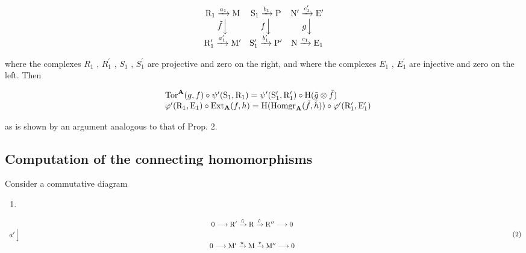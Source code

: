 \[
\begin{array}{c c c} \mathrm{R} _ {1} \xrightarrow {a _ {1}} \mathrm{M} & \mathrm{S} _ {1} \xrightarrow {b _ {1}} \mathrm{P} & \mathrm{N} ^ {\prime} \xrightarrow {c _ {1} ^ {\prime}} \mathrm{E} ^ {\prime} \\ \tilde {f} \Big \downarrow & f \Big \downarrow & g \Big \downarrow \\ \mathrm{R} _ {1} ^ {\prime} \xrightarrow {a _ {1} ^ {\prime}} \mathrm{M} ^ {\prime} & \mathrm{S} _ {1} ^ {\prime} \xrightarrow {b _ {1} ^ {\prime}} \mathrm{P} ^ {\prime} & \mathrm{N} \xrightarrow {c _ {1}} \mathrm{E} _ {1} \end{array}
\]

where the complexes \(R_{1}\) , \(R_{1}^{\prime}\) , \(S_{1}\) , \(S_{1}^{\prime}\) are projective and zero on the right, and where the complexes \(E_{1}\) , \(E_{1}^{\prime}\) are injective and zero on the left. Then

\[
\begin{array}{r l} & {\mathrm{Tor} ^ {\mathbf {A}} (g, f) \circ \psi^ {\prime} (\mathrm{S} _ {1}, \mathrm{R} _ {1}) = \psi^ {\prime} (\mathrm{S} _ {1} ^ {\prime}, \mathrm{R} _ {1} ^ {\prime}) \circ \mathrm{H} (\tilde {g} \otimes \tilde {f})} \\ & {\varphi^ {\prime} (\mathrm{R} _ {1}, \mathrm{E} _ {1}) \circ \mathrm{Ext} _ {\mathbf {A}} (f, h) = \mathrm{H} (\mathrm{Homgr} _ {\mathbf {A}} (\tilde {f}, \tilde {h})) \circ \varphi^ {\prime} (\mathrm{R} _ {1} ^ {\prime}, \mathrm{E} _ {1} ^ {\prime})} \end{array}
\]

as is shown by an argument analogous to that of Prop. 2.

\subsection{Computation of the connecting homomorphisms}

Consider a commutative diagram

\begin{enumerate}
\def\labelenumi{(\arabic{enumi})}
\tightlist
\item
\end{enumerate}

\[
\begin{array}{c} 0 \longrightarrow \mathrm{R} ^ {\prime} \xrightarrow {\tilde {u}} \mathrm{R} \xrightarrow {\tilde {v}} \mathrm{R} ^ {\prime \prime} \longrightarrow 0 \\ a ^ {\prime} \Big \downarrow \qquad \qquad \qquad \qquad \qquad \qquad \qquad \qquad \qquad \qquad \qquad \qquad \qquad \qquad \qquad \qquad \qquad \qquad \qquad \qquad \qquad \qquad \qquad \qquad \qquad \qquad \qquad \qquad \qquad \qquad \qquad \qquad \qquad \qquad \\ 0 \longrightarrow \mathrm{M} ^ {\prime} \xrightarrow {u} \mathrm{M} \xrightarrow {v} \mathrm{M} ^ {\prime \prime} \longrightarrow 0 \end{array}\tag{2}
\]

